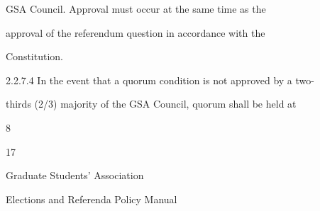                 GSA  Council.  Approval  must  occur  at  the  same  time  as  the  

                approval  of  the  referendum  question  in  accordance  with  the  

                Constitution.  

2.2.7.4         In the  event  that a  quorum  condition  is  not  approved  by  a  two- 

                thirds (2/3) majority of the GSA Council, quorum shall be held at  

                8%

                  

  

  

  

  

  

  

  

                                                         17  

                                                                                                                    

                                  Graduate Students’ Association  

                            Elections and Referenda Policy Manual  

  

